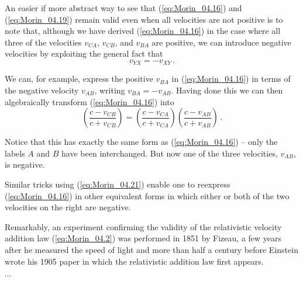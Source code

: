 An easier if more abstract way to see that (\ref{eq:Morin_04.16}) and (\ref{eq:Morin_04.19}) remain valid even when all velocities are not positive is to note that, although we have derived (\ref{eq:Morin_04.16}) in the case where all three of the velocities $v_{CA}$, $v_{CB}$, and $v_{BA}$ are positive, we can introduce negative velocities by exploiting the general fact that 
\begin{equation}\label{eq:Morin_04.21}
v_{YX} = -v_{XY}\,.
\end{equation}

We can, for example, express the positive $v_{BA}$ in (\ref{eq:Morin_04.16}) in terms of the negative velocity $v_{AB}$, writing $v_{BA} = - v_{AB}$. Having done this we can then algebraically transform (\ref{eq:Morin_04.16}) into 
\begin{equation}\label{eq:Morin_04.22}
\left( \frac{c - v_{CB}}{c + v_{CB}} \right) = \left( \frac{c - v_{CA}}{c + v_{CA}} \right)  \left( \frac{c - v_{AB}}{c + v_{AB}} \right)\,.
\end{equation}

Notice that this has exactly the same form as (\ref{eq:Morin_04.16}) -- only the labels $A$ and $B$ have been interchanged. But now one of the three velocities, $v_{AB}$, is negative.

Similar tricks using (\ref{eq:Morin_04.21}) enable one to reexpress (\ref{eq:Morin_04.16}) in other equivalent forms in which either or both of the two velocities on the right are negative.

Remarkably, an experiment confirming the validity of the relativistic velocity addition law (\ref{eq:Morin_04.2}) was performed in 1851 by Fizeau, a few years after he measured the speed of light and more than half a century before Einstein wrote his 1905 paper in which the relativistic addition law first appears. 

$\cdots$
 







 





